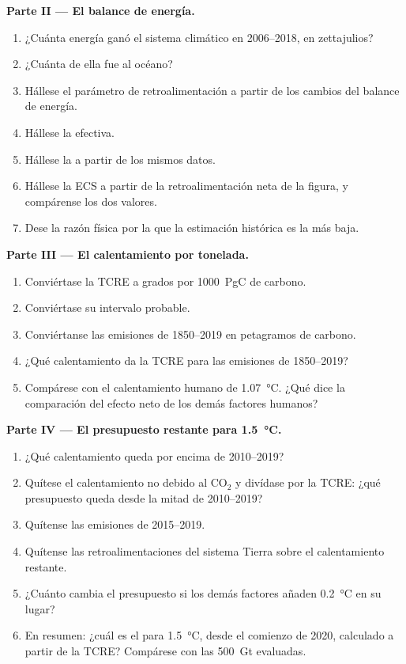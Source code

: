 \begin{problem}
\noindent\textbf{Parte II --- El balance de energía.}
\begin{enumerate}[resume]
  \item ¿Cuánta energía ganó el sistema climático en 2006--2018, en zettajulios?
  \item ¿Cuánta de ella fue al océano?
  \item Hállese el parámetro de retroalimentación a partir de los cambios del balance de energía.
  \item Hállese la  efectiva.
  \item Hállese la  a partir de los mismos datos.
  \item Hállese la ECS a partir de la retroalimentación neta de la figura, y compárense los dos valores.
  \item Dese la razón física por la que la estimación histórica es la más baja.
\end{enumerate}

\noindent\textbf{Parte III --- El calentamiento por tonelada.}
\begin{enumerate}[resume]
  \item Conviértase la TCRE a grados por \qty{1000}{PgC} de carbono.
  \item Conviértase su intervalo probable.
  \item Conviértanse las emisiones de 1850--2019 en petagramos de carbono.
  \item ¿Qué calentamiento da la TCRE para las emisiones de 1850--2019?
  \item Compárese con el calentamiento humano de \qty{1.07}{\celsius}. ¿Qué dice la comparación del
        efecto neto de los demás factores humanos?
\end{enumerate}

\noindent\textbf{Parte IV --- El presupuesto restante para \qty{1.5}{\celsius}.}
\begin{enumerate}[resume]
  \item ¿Qué calentamiento queda por encima de 2010--2019?
  \item Quítese el calentamiento no debido al CO$_2$ y divídase por la TCRE: ¿qué presupuesto queda desde la mitad
        de 2010--2019?
  \item Quítense las emisiones de 2015--2019.
  \item Quítense las retroalimentaciones del sistema Tierra sobre el calentamiento restante.
  \item ¿Cuánto cambia el presupuesto si los demás factores añaden \qty{0.2}{\celsius} en su lugar?
  \item En resumen: ¿cuál es el  para \qty{1.5}{\celsius}, desde el comienzo de
        2020, calculado a partir de la TCRE? Compárese con las \qty{500}{Gt} evaluadas.
\end{enumerate}
\end{problem}
